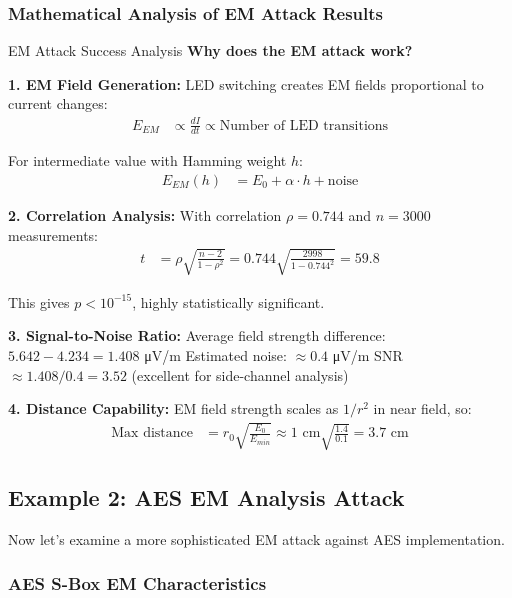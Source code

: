 \documentclass[11pt,a4paper]{article}
\theoremstyle{definition}
\begin{document}
\subsubsection{Mathematical Analysis of EM Attack Results}

\begin{mathematicsbox}{EM Attack Success Analysis}
\textbf{Why does the EM attack work?}

\textbf{1. EM Field Generation:}
LED switching creates EM fields proportional to current changes:
\begin{align}
E_{EM} &\propto \frac{dI}{dt} \propto \text{Number of LED transitions}
\end{align}

For intermediate value with Hamming weight $h$:
\begin{align}
E_{EM}(h) &= E_0 + \alpha \cdot h + \text{noise}
\end{align}

\textbf{2. Correlation Analysis:}
With correlation $\rho = 0.744$ and $n = 3000$ measurements:
\begin{align}
t &= \rho\sqrt{\frac{n-2}{1-\rho^2}} = 0.744\sqrt{\frac{2998}{1-0.744^2}} = 59.8
\end{align}

This gives $p < 10^{-15}$, highly statistically significant.

\textbf{3. Signal-to-Noise Ratio:}
Average field strength difference: $5.642 - 4.234 = 1.408$ μV/m
Estimated noise: $\approx 0.4$ μV/m
SNR $\approx 1.408/0.4 = 3.52$ (excellent for side-channel analysis)

\textbf{4. Distance Capability:}
EM field strength scales as $1/r^2$ in near field, so:
\begin{align}
\text{Max distance} &= r_0 \sqrt{\frac{E_0}{E_{min}}} \approx 1 \text{ cm} \sqrt{\frac{1.4}{0.1}} = 3.7 \text{ cm}
\end{align}
\end{mathematicsbox}

\subsection{Example 2: AES EM Analysis Attack}

Now let's examine a more sophisticated EM attack against AES implementation.

\subsubsection{AES S-Box EM Characteristics}
\end{document}
